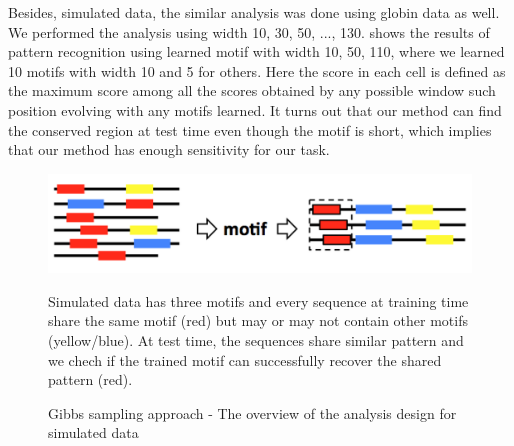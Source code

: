 \documentclass[11pt, oneside]{article}
\begin{document}
Besides, simulated data, the similar analysis was done using globin data as well. We performed the analysis using width 10, 30, 50, ..., 130.  shows the results of pattern recognition using learned motif with width 10, 50, 110, where we learned 10 motifs with width 10 and 5 for others. Here the score in each cell is defined as the maximum score among all the scores obtained by any possible window such position evolving with any motifs learned. It turns out that our method can find the conserved region at test time even though the motif is short, which implies that our method has enough sensitivity for our task.
\begin{figure}
  \centering
  \begin{minipage}{0.8\textwidth} %
  \includegraphics[width=\textwidth]{images/chart}
  {\footnotesize Simulated data has three motifs and every sequence at training time share the same motif (red) but may or may not contain other motifs (yellow/blue). At test time, the sequences share similar pattern and we chech if the trained motif can successfully recover the shared pattern (red).\par}
  \end{minipage}
  \caption{Gibbs sampling approach - The overview of the analysis design for simulated data}
  \label{fig:design}
\end{figure}
\end{document}
